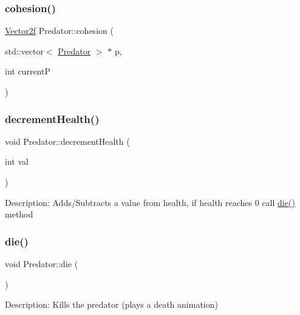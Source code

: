 \mbox{\label{class_predator_a55f6ee2c3cd0fbe79cd8b7f1329338ed}} 
\subsubsection{\texorpdfstring{cohesion()}{cohesion()}}
{\footnotesize\ttfamily \mbox{\hyperlink{class_vector2f}{Vector2f}} Predator\+::cohesion (\begin{DoxyParamCaption}\item[{std\+::vector$<$ \mbox{\hyperlink{class_predator}{Predator}} $>$ $\ast$}]{p,  }\item[{int}]{currentP }\end{DoxyParamCaption})}

\mbox{\label{class_predator_ac1d720679ac232c291cfc4dac4d887a1}} 
\subsubsection{\texorpdfstring{decrementHealth()}{decrementHealth()}}
{\footnotesize\ttfamily void Predator\+::decrement\+Health (\begin{DoxyParamCaption}\item[{int}]{val }\end{DoxyParamCaption})}

Description\+: Adds/\+Subtracts a value from health, if health reaches 0 call \mbox{\hyperlink{class_predator_a67e5da42f1a7e8a92e066e2f9402af5e}{die()}} method \mbox{\label{class_predator_a67e5da42f1a7e8a92e066e2f9402af5e}} 
\subsubsection{\texorpdfstring{die()}{die()}}
{\footnotesize\ttfamily void Predator\+::die (\begin{DoxyParamCaption}{ }\end{DoxyParamCaption})}

Description\+: Kills the predator (plays a death animation) \mbox{\label{class_predator_abd7de2991eb29a4ae7fa0d57124e4be3}} 
